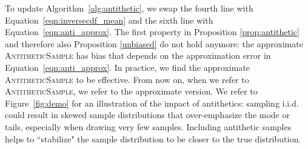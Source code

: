 To update Algorithm~\ref{alg:antithetic}, we swap the fourth line with Equation~\ref{eqn:inversecdf_mean} and the sixth line with Equation~\ref{eqn:anti_approx}.
The first property in Proposition \ref{prop:antithetic} and therefore also Proposition \ref{unbiased} do not hold anymore: the approximate \textsc{AntitheticSample} has bias that depends on the approximation error in Equation~\ref{eqn:anti_approx}.
%
In practice, we find the approximate \textsc{AntitheticSample} to be effective.
From now on, when we refer to \textsc{AntitheticSample}, we refer to the approximate version. We refer to Figure~\ref{fig:demo} for an illustration of the impact of antithetics: sampling i.i.d. could result in skewed sample distributions that over-emphasize the mode or tails, especially when drawing very few samples. Including antithetic samples helps to ``stabilize" the sample distribution to be closer to the true distribution.


